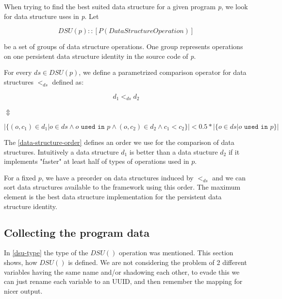 \documentclass[a4paper,11pt]{article}
\begin{document}
		When trying to find the best suited data structure for a given program \emph{p}, we look for data structure
		uses in \emph{p}. Let

		\begin{equation} \label{dsu-type}
			DSU(p) :: [P(DataStructureOperation)]
		\end{equation}

		be a set of groups of data structure operations. One group represents operations on one persistent
        data structure identity in the source code of \emph{p}.

		For every $ds \in DSU(p)$, we define a parametrized comparison operator for data structures $<_{ds}$
		defined as:

		\begin{center}

			\begin{equation}
				d_1 <_{ds} d_2
			\end{equation}

			$\Updownarrow$

			\begin{equation} \label{data-structure-order}
|\{(o, c_1) \in d_1 | o \in ds \wedge o \texttt{ used in $p$} \wedge (o,c_2) \in d_2 \wedge c_1 < c_2 \}| < 0.5 *
 |\{o \in ds | o \texttt{ used in $p$} \}|
			\end{equation}

		\end{center}

		The \autoref{data-structure-order} defines an order we use for the comparison of data
		structures. Intuitively a data structure $d_1$ is better than a data stucture $d_2$ if
		it implements "faster" at least half of types of operations used in $p$.

		For a fixed $p$, we have a preorder on data structures induced by $<_{ds}$ and we can sort data structures
		available to the framework using this order. The maximum element is the best data structure
		implementation for the persistent data structure identity.

	\subsection{Collecting the program data} \label{dsu-definition}

		In \autoref{dsu-type} the type of the $DSU()$ operation was mentioned. This section shows, how $DSU()$ is
		defined. We are not considering the problem of 2 different variables having the same name and/or shadowing each
        other, to evade this we can just rename each variable to an UUID, and then remember the mapping for nicer
        output.
\end{document}
